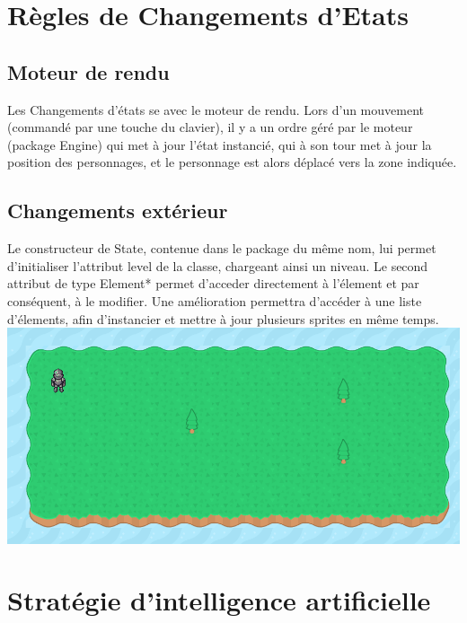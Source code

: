 \documentclass[12pt,a4paper]{report}
\begin{document}
        \chapter{Règles de Changements d'Etats}
        
    \section{Moteur de rendu}
    Les Changements d'états se  avec le moteur de rendu. Lors d'un mouvement (commandé par une touche du clavier), il y a un ordre géré par le moteur (package Engine) qui met à jour l'état instancié, qui à son tour met à jour la position des personnages, et le personnage est alors déplacé vers la zone indiquée.


    \section{Changements extérieur}
	Le constructeur de State, contenue dans le package du même nom, lui permet d'initialiser l'attribut level de la classe, chargeant ainsi un niveau. Le second attribut de type Element* permet d'acceder directement à l'élement et par conséquent, à le modifier. Une amélioration permettra d'accéder à une liste d'élements, afin d'instancier et mettre à jour plusieurs sprites en même temps.
\includegraphics[width=1\textwidth]{MapPerso.png}
    \chapter{Stratégie d'intelligence artificielle}
    
\end{document}
